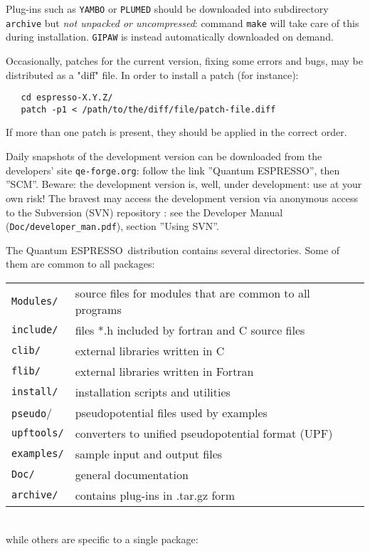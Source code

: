 \documentclass[12pt,a4paper]{article}
\def\qe{{\sc Quantum ESPRESSO}}
\begin{document}
Plug-ins such as \texttt{YAMBO} or \texttt{PLUMED} should be downloaded into
subdirectory \texttt{archive} but {\em not unpacked or uncompressed}:
command \texttt{make} will take care of this during installation. 
\texttt{GIPAW} is instead automatically downloaded on demand.

Occasionally, patches for the current version, fixing some errors and bugs,
may be distributed as a "diff" file. In order to install a patch (for 
instance):
\begin{verbatim}
   cd espresso-X.Y.Z/
   patch -p1 < /path/to/the/diff/file/patch-file.diff
\end{verbatim}
If more than one patch is present, they should be applied in the correct order.

Daily snapshots of the development version can be downloaded from the
developers' site \texttt{qe-forge.org}: follow the link ''Quantum ESPRESSO'', 
then ''SCM''. Beware: the development version 
is, well, under development: use at your own risk! The bravest 
may access the development version via anonymous access to the
Subversion (SVN) repository : see the Developer Manual
(\texttt{Doc/developer\_man.pdf}), section ''Using SVN''.

The \qe\ distribution contains several directories. Some of them are
common to all packages:

\begin{tabular}{ll}
\texttt{Modules/} &  source files for modules that are common to all programs\\
\texttt{include/} &  files *.h included by fortran and C source files\\
\texttt{clib/}    &  external libraries written in C\\
\texttt{flib/}    &  external libraries written in Fortran\\
\texttt{install/} &  installation scripts and utilities\\
\texttt{pseudo}/  &  pseudopotential files used by examples\\
\texttt{upftools/}&  converters to unified pseudopotential format (UPF)\\
\texttt{examples/}&  sample input and output files\\
\texttt{Doc/}     &  general documentation\\
\texttt{archive/} &  contains plug-ins in .tar.gz form\\
\end{tabular}
\\
while others are specific to a single package:
\end{document}
